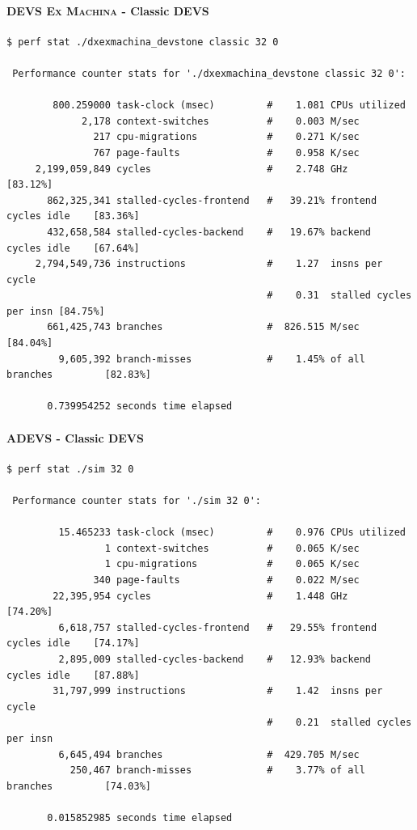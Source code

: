 \documentclass[8pt,a4paper]{report}
\begin{document}
\paragraph{\textsc{DEVS Ex Machina} - Classic DEVS}
\begin{Verbatim}[fontsize=\small]
$ perf stat ./dxexmachina_devstone classic 32 0

 Performance counter stats for './dxexmachina_devstone classic 32 0':

        800.259000 task-clock (msec)         #    1.081 CPUs utilized          
             2,178 context-switches          #    0.003 M/sec                  
               217 cpu-migrations            #    0.271 K/sec                  
               767 page-faults               #    0.958 K/sec                  
     2,199,059,849 cycles                    #    2.748 GHz                     [83.12%]
       862,325,341 stalled-cycles-frontend   #   39.21% frontend cycles idle    [83.36%]
       432,658,584 stalled-cycles-backend    #   19.67% backend  cycles idle    [67.64%]
     2,794,549,736 instructions              #    1.27  insns per cycle        
                                             #    0.31  stalled cycles per insn [84.75%]
       661,425,743 branches                  #  826.515 M/sec                   [84.04%]
         9,605,392 branch-misses             #    1.45% of all branches         [82.83%]

       0.739954252 seconds time elapsed
\end{Verbatim}
\paragraph{\textsc{ADEVS} - Classic DEVS}
\begin{Verbatim}[fontsize=\small]
$ perf stat ./sim 32 0

 Performance counter stats for './sim 32 0':

         15.465233 task-clock (msec)         #    0.976 CPUs utilized          
                 1 context-switches          #    0.065 K/sec                  
                 1 cpu-migrations            #    0.065 K/sec                  
               340 page-faults               #    0.022 M/sec                  
        22,395,954 cycles                    #    1.448 GHz                     [74.20%]
         6,618,757 stalled-cycles-frontend   #   29.55% frontend cycles idle    [74.17%]
         2,895,009 stalled-cycles-backend    #   12.93% backend  cycles idle    [87.88%]
        31,797,999 instructions              #    1.42  insns per cycle        
                                             #    0.21  stalled cycles per insn
         6,645,494 branches                  #  429.705 M/sec                  
           250,467 branch-misses             #    3.77% of all branches         [74.03%]

       0.015852985 seconds time elapsed
\end{Verbatim}
\end{document}
